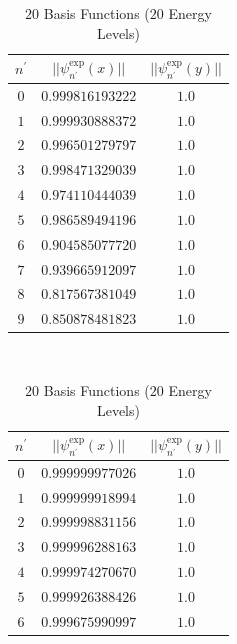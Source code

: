 \documentclass[../main.tex]{subfiles}
\begin{document}
\begin{table}[!ht]
  \centering
  \begin{subtable}{.4\linewidth}
      \centering
      \begin{tabular}{ | c | c | c | }
        \hline
        $n^\prime$ & $||\psi_{n^\prime}^\textrm{exp}(x)||$ & $||\psi_{n^\prime}^\textrm{exp}(y)||$\\*
        \hline
        $0$ & $0.999816193222$ & $1.0$\\*
        \hline
        $1$ & $0.999930888372$ & $1.0$\\*
        \hline
        $2$ & $0.996501279797$ & $1.0$\\*
        \hline
        $3$ & $0.998471329039$ & $1.0$\\*
        \hline
        $4$ & $0.974110444039$ & $1.0$\\*
        \hline
        $5$ & $0.986589494196$ & $1.0$\\*
        \hline
        $6$ & $0.904585077720$ & $1.0$\\*
        \hline
        $7$ & $0.939665912097$ & $1.0$\\*
        \hline
        $8$ & $0.817567381049$ & $1.0$\\*
        \hline
        $9$ & $0.850878481823$ & $1.0$\\*
        \hline
      \end{tabular}
      \caption{$20$ Basis Functions ($20$ Energy Levels)}
      \label{tab:NormE20a}
  \end{subtable}
  ~
  \begin{subtable}{.4\linewidth}
    \centering
    \begin{tabular}{ | c | c | c | }
        \hline
        $n^\prime$ & $||\psi_{n^\prime}^\textrm{exp}(x)||$ & $||\psi_{n^\prime}^\textrm{exp}(y)||$\\*
        \hline
        $0$ & $0.999999977026$ & $1.0$\\*
        \hline
        $1$ & $0.999999918994$ & $1.0$\\*
        \hline
        $2$ & $0.999998831156$ & $1.0$\\*
        \hline
        $3$ & $0.999996288163$ & $1.0$\\*
        \hline
        $4$ & $0.999974270670$ & $1.0$\\*
        \hline
        $5$ & $0.999926388426$ & $1.0$\\*
        \hline
        $6$ & $0.999675990997$ & $1.0$\\*
        \hline

\end{tabular}
\end{subtable}
\end{table}
\end{document}
